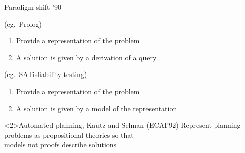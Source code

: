 \begin{frame}{Paradigm shift '90}
  \bigskip

  \begin{description}

  \item<1->[Theorem Proving based approach] (eg.\ Prolog)
    \begin{enumerate}
    \item Provide a representation of the problem

    \item A solution is given by a \alert{derivation} of a query
    \end{enumerate}
    \bigskip

  \item<1->[Model Generation based approach] (eg.\ SATisfiability testing)
    \begin{enumerate}
    \item Provide a representation of the problem

    \item A solution is given by a \alert{model} of the representation
    \end{enumerate}
  \end{description}
  \bigskip
  \begin{block}<2>{Automated planning, Kautz and Selman (ECAI'92)}
      Represent planning problems as propositional theories
      so that\\ models not proofs describe solutions
  \end{block}
\end{frame}
%
